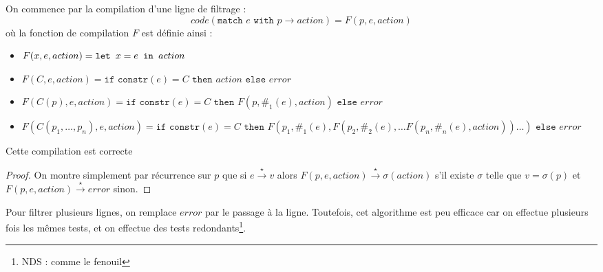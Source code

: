 \documentclass{cours}
\begin{document}
On commence par la compilation d'une ligne de filtrage : 
\[
    code(\texttt{match } e \texttt{ with } p \rightarrow action) = F(p, e, action)
\]
où la fonction de compilation $F$ est définie ainsi : 
\begin{itemize}
    \item $F(x, e, action) = \texttt{let } x = e \texttt{ in }{action}$
    \item $F(C, e, action) = \texttt{if constr}(e) = C \texttt{ then } action \texttt{ else } error$
    \item $F(C(p), e, action) = \texttt{if constr}(e) = C \texttt{ then } F(p, \texttt{\#}_{1}(e), action) \texttt{ else } error$
    \item $F(C(p_{1}, \ldots, p_{n}), e, action) = \texttt{if constr}(e) = C \texttt{ then } F(p_{1}, \texttt{\#}_{1}(e), F(p_{2}, \texttt{\#}_{2}(e), \ldots F(p_{n}, \texttt{\#}_{n}(e), action)) \ldots) \texttt{ else } error$
\end{itemize} 

\begin{proposition}
    Cette compilation est correcte
\end{proposition}
\begin{proof}
    On montre simplement par récurrence sur $p$ que si $e\xrightarrow{\star} v$ alors $F(p, e, action) \xrightarrow{\star} \sigma(action)$ s'il existe $\sigma$ telle que $v = \sigma(p)$ et $F(p, e, action) \xrightarrow{\star} error$ sinon. 
\end{proof}

Pour filtrer plusieurs lignes, on remplace $error$ par le passage à la ligne. Toutefois, cet algorithme est peu efficace car on effectue plusieurs fois les mêmes tests, et on effectue des tests redondants\footnote{NDS : comme le fenouil}.
\end{document}
